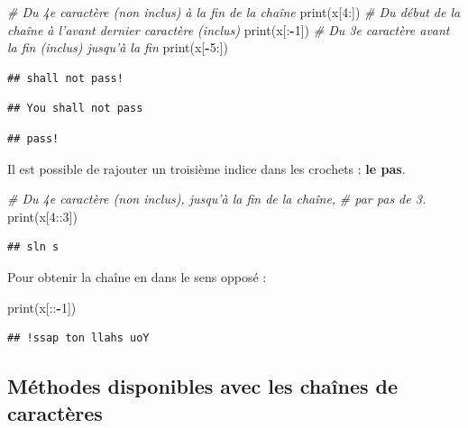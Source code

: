 \documentclass[12pt,]{book}
\newenvironment{Shaded}{\begin{snugshade}}{\end{snugshade}}
\newcommand{\DecValTok}[1]{\textcolor[rgb]{0.00,0.00,0.81}{#1}}
\newcommand{\CommentTok}[1]{\textcolor[rgb]{0.56,0.35,0.01}{\textit{#1}}}
\newcommand{\OperatorTok}[1]{\textcolor[rgb]{0.81,0.36,0.00}{\textbf{#1}}}
\newcommand{\BuiltInTok}[1]{#1}
\newcommand{\NormalTok}[1]{#1}
\numberwithin{equation}{section}
\numberwithin{countremarque}{section}
\begin{document}
\begin{Shaded}
\begin{Highlighting}[]
\CommentTok{# Du 4e caractère (non inclus) à la fin de la chaîne}
\BuiltInTok{print}\NormalTok{(x[}\DecValTok{4}\NormalTok{:])}
\CommentTok{# Du début de la chaîne à l'avant dernier caractère (inclus)}
\BuiltInTok{print}\NormalTok{(x[:}\OperatorTok{-}\DecValTok{1}\NormalTok{])}
\CommentTok{# Du 3e caractère avant la fin (inclus) jusqu'à la fin}
\BuiltInTok{print}\NormalTok{(x[}\OperatorTok{-}\DecValTok{5}\NormalTok{:])}
\end{Highlighting}
\end{Shaded}

\begin{lstlisting}
## shall not pass!
\end{lstlisting}

\begin{lstlisting}
## You shall not pass
\end{lstlisting}

\begin{lstlisting}
## pass!
\end{lstlisting}

Il est possible de rajouter un troisième indice dans les crochets :
\textbf{le pas}.

\begin{Shaded}
\begin{Highlighting}[]
\CommentTok{# Du 4e caractère (non inclus), jusqu'à la fin de la chaîne,}
\CommentTok{# par pas de 3.}
\BuiltInTok{print}\NormalTok{(x[}\DecValTok{4}\NormalTok{::}\DecValTok{3}\NormalTok{])}
\end{Highlighting}
\end{Shaded}

\begin{lstlisting}
## sln s
\end{lstlisting}

Pour obtenir la chaîne en dans le sens opposé :

\begin{Shaded}
\begin{Highlighting}[]
\BuiltInTok{print}\NormalTok{(x[::}\OperatorTok{-}\DecValTok{1}\NormalTok{])}
\end{Highlighting}
\end{Shaded}

\begin{lstlisting}
## !ssap ton llahs uoY
\end{lstlisting}

\subsection{Méthodes disponibles avec les chaînes de
caractères}\label{methodes-disponibles-avec-les-chaines-de-caracteres}
\end{document}
